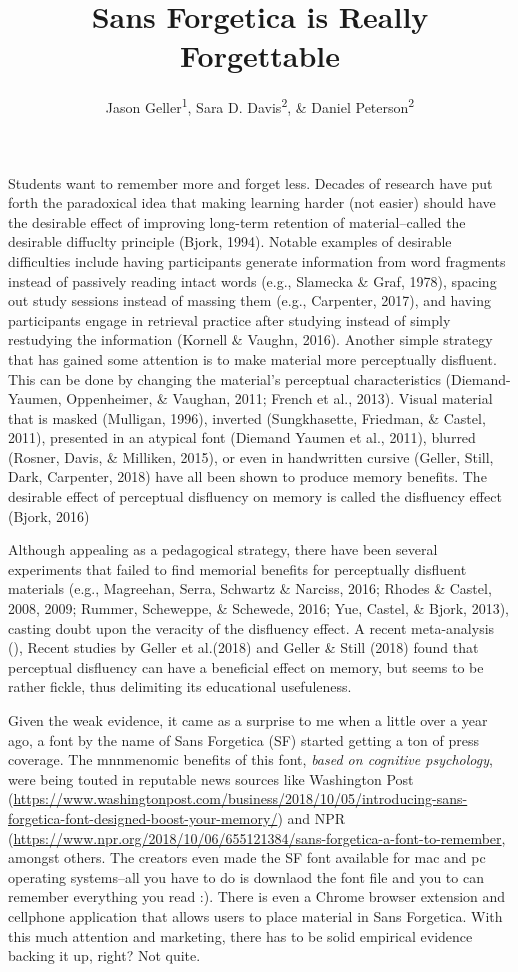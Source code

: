 \documentclass[doc]{apa6}
\affiliation{
\vspace{0.5cm}
\textsuperscript{1} University of Iowa\\\textsuperscript{2} Skidmore College}
\title{Sans Forgetica is Really Forgettable}
\author{Jason Geller\textsuperscript{1}, Sara D. Davis\textsuperscript{2}, \& Daniel Peterson\textsuperscript{2}}
\date{}
\begin{document}
\maketitle

Students want to remember more and forget less. Decades of research have put forth the paradoxical idea that making learning harder (not easier) should have the desirable effect of improving long-term retention of material--called the desirable diffuclty principle (Bjork, 1994). Notable examples of desirable difficulties include having participants generate information from word fragments instead of passively reading intact words (e.g., Slamecka \& Graf, 1978), spacing out study sessions instead of massing them (e.g., Carpenter, 2017), and having participants engage in retrieval practice after studying instead of simply restudying the information (Kornell \& Vaughn, 2016). Another simple strategy that has gained some attention is to make material more perceptually disfluent. This can be done by changing the material's perceptual characteristics (Diemand-Yaumen, Oppenheimer, \& Vaughan, 2011; French et al., 2013). Visual material that is masked (Mulligan, 1996), inverted (Sungkhasette, Friedman, \& Castel, 2011), presented in an atypical font (Diemand Yaumen et al., 2011), blurred (Rosner, Davis, \& Milliken, 2015), or even in handwritten cursive (Geller, Still, Dark, Carpenter, 2018) have all been shown to produce memory benefits. The desirable effect of perceptual disfluency on memory is called the disfluency effect (Bjork, 2016)

Although appealing as a pedagogical strategy, there have been several experiments that failed to find memorial benefits for perceptually disfluent
materials (e.g., Magreehan, Serra, Schwartz \& Narciss, 2016; Rhodes \& Castel, 2008, 2009; Rummer, Scheweppe, \& Schewede, 2016; Yue,
Castel, \& Bjork, 2013), casting doubt upon the veracity of the disfluency effect. A recent meta-analysis (), Recent studies by Geller et al.(2018) and Geller \& Still (2018) found that perceptual disfluency can have a beneficial effect on memory, but seems to be rather fickle, thus delimiting its educational usefuleness.

Given the weak evidence, it came as a surprise to me when a little over a year ago, a font by the name of Sans Forgetica (SF) started getting a ton of press coverage. The mnnmenomic benefits of this font, \emph{based on cognitive psychology}, were being touted in reputable news sources like Washington Post (\url{https://www.washingtonpost.com/business/2018/10/05/introducing-sans-forgetica-font-designed-boost-your-memory/}) and NPR (\url{https://www.npr.org/2018/10/06/655121384/sans-forgetica-a-font-to-remember}, amongst others. The creators even made the SF font available for mac and pc operating systems--all you have to do is downlaod the font file and you to can remember everything you read :). There is even a Chrome browser extension and cellphone application that allows users to place material in Sans Forgetica. With this much attention and marketing, there has to be solid empirical evidence backing it up, right? Not quite.
\end{document}
